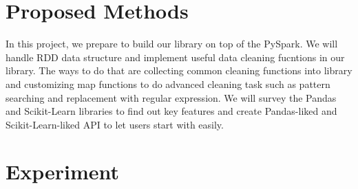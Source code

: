 \documentclass[sigconf]{acmart}
\begin{document}
\section{Proposed Methods}
In this project, we prepare to build our library on top of the PySpark\cite{pyspark, spark}. We will handle RDD data structure and implement useful data cleaning fucntions in our library. The ways to do that are collecting common cleaning functions into library and customizing map functions to do advanced cleaning task such as pattern searching and replacement with regular expression. We will survey the Pandas\cite{pandas} and Scikit-Learn\cite{scikit-learn} libraries to find out key features and create Pandas-liked and Scikit-Learn-liked API to let users start with easily.

\section{Experiment}
\end{document}
